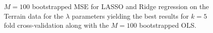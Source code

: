 \documentclass[reprint, english, nofootinbib]{revtex4-2}
\begin{document}
   \begin{figure}
        \centering
         \caption{\label{fig:}$M=100$ bootstrapped MSE for LASSO and Ridge regression on the Terrain data for the $\lambda$ parameters yielding the best results for $k=5$ fold cross-validation along with the $M = 100$ bootstrapped OLS.}
         \label{contour plots}
    \end{figure}
\end{document}
